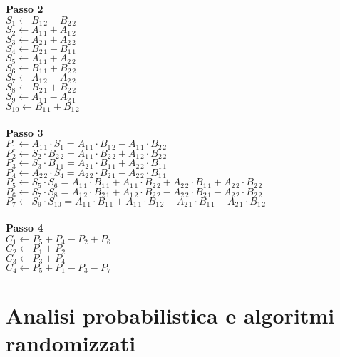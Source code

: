 \documentclass[10pt, a4paper]{report}
\begin{document}
\textbf{Passo 2}\\
$S_1 \leftarrow B_{1\,2} - B_{2\,2} $\\
$S_2 \leftarrow A_{1\,1} + A_{1\,2} $\\
$S_3 \leftarrow A_{2\,1} + A_{2\,2} $\\
$S_4 \leftarrow B_{2\,1} - B_{1\,1} $\\
$S_5 \leftarrow A_{1\,1} + A_{2\,2} $\\
$S_6 \leftarrow B_{1\,1} + B_{2\,2} $\\
$S_7 \leftarrow A_{1\,2} - A_{2\,2} $\\
$S_8 \leftarrow B_{2\,1} + B_{2\,2} $\\
$S_9 \leftarrow A_{1\,1} - A_{2\,1} $\\
$S_{10} \leftarrow B_{1\,1} + B_{1\,2}$ \\\\
\textbf{Passo 3}\\
$P_1 \leftarrow A_{1\,1} \cdot S_1 = A_{1\,1} \cdot B_{1\,2} - A_{1\,1} \cdot B_{2\,2} $ \\
$P_2 \leftarrow S_{2} \cdot B_{2\,2} = A_{1\,1} \cdot B_{2\,2} + A_{1\,2} \cdot B_{2\,2} $ \\
$P_3 \leftarrow S_{3} \cdot B_{1\,1} = A_{2\,1} \cdot B_{1\,1} + A_{2\,2} \cdot B_{1\,1} $ \\
$P_4 \leftarrow A_{2\,2} \cdot S_4 = A_{2\,2} \cdot B_{2\,1} - A_{2\,2} \cdot B_{1\,1} $ \\
$P_5 \leftarrow S_5 \cdot S_6 = A_{1\,1} \cdot B_{1\,1} + A_{1\,1} \cdot B_{2\,2} + A_{2\,2} \cdot B_{1\,1} + A_{2\,2} \cdot B_{2\,2} $ \\
$P_6 \leftarrow S_7 \cdot S_8 = A_{1\,2} \cdot B_{2\,1} + A_{1\,2} \cdot B_{2\,2} - A_{2\,2} \cdot B_{2\,1} - A_{2\,2} \cdot B_{2\,2} $ \\
$P_7 \leftarrow S_9 \cdot S_{10} = A_{1\,1} \cdot B_{1\,1} + A_{1\,1} \cdot B_{1\,2} - A_{2\,1} \cdot B_{1\,1} - A_{2\,1} \cdot B_{1\,2} $ \\\\
\textbf{Passo 4}\\
$C_1 \leftarrow  P_5 + P_4 - P_2 + P_6$ \\
$C_2 \leftarrow P_1 + P_2$ \\
$C_3 \leftarrow P_3 + P_4$ \\
$C_4 \leftarrow P_5 + P_1 - P_3 - P_7$
\chapter{Analisi probabilistica e algoritmi randomizzati}
\end{document}
